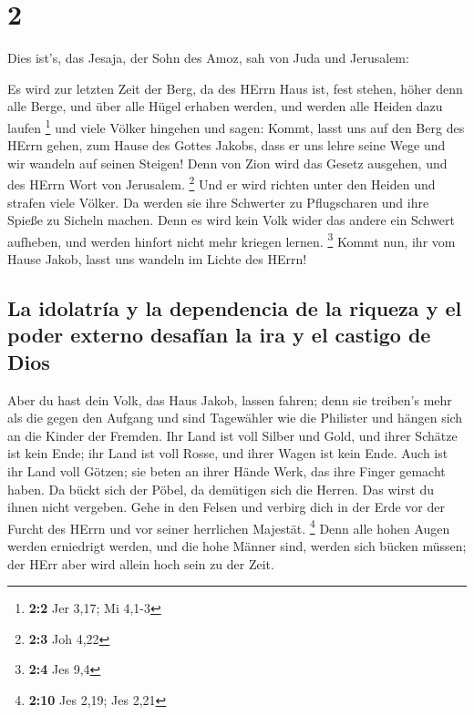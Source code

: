 \hypertarget{section-1}{%
\section{2}\label{section-1}}

 Dies ist's, das Jesaja, der Sohn des Amoz, sah von Juda
und Jerusalem:

 Es wird zur letzten Zeit der Berg, da des HErrn Haus ist,
fest stehen, höher denn alle Berge, und über alle Hügel erhaben werden,
und werden alle Heiden dazu laufen \footnote{\textbf{2:2} Jer 3,17; Mi
  4,1-3}  und viele Völker hingehen und sagen: Kommt,
lasst uns auf den Berg des HErrn gehen, zum Hause des Gottes Jakobs,
dass er uns lehre seine Wege und wir wandeln auf seinen Steigen! Denn
von Zion wird das Gesetz ausgehen, und des HErrn Wort von Jerusalem.
\footnote{\textbf{2:3} Joh 4,22}  Und er wird richten
unter den Heiden und strafen viele Völker. Da werden sie ihre Schwerter
zu Pflugscharen und ihre Spieße zu Sicheln machen. Denn es wird kein
Volk wider das andere ein Schwert aufheben, und werden hinfort nicht
mehr kriegen lernen. \footnote{\textbf{2:4} Jes 9,4} 
Kommt nun, ihr vom Hause Jakob, lasst uns wandeln im Lichte des HErrn!

\hypertarget{la-idolatruxeda-y-la-dependencia-de-la-riqueza-y-el-poder-externo-desafuxedan-la-ira-y-el-castigo-de-dios}{%
\subsection{La idolatría y la dependencia de la riqueza y el poder
externo desafían la ira y el castigo de
Dios}\label{la-idolatruxeda-y-la-dependencia-de-la-riqueza-y-el-poder-externo-desafuxedan-la-ira-y-el-castigo-de-dios}}

 Aber du hast dein Volk, das Haus Jakob, lassen fahren;
denn sie treiben's mehr als die gegen den Aufgang und sind Tagewähler
wie die Philister und hängen sich an die Kinder der Fremden.
 Ihr Land ist voll Silber und Gold, und ihrer Schätze ist
kein Ende; ihr Land ist voll Rosse, und ihrer Wagen ist kein Ende.
 Auch ist ihr Land voll Götzen; sie beten an ihrer Hände
Werk, das ihre Finger gemacht haben.  Da bückt sich der
Pöbel, da demütigen sich die Herren. Das wirst du ihnen nicht vergeben.
 Gehe in den Felsen und verbirg dich in der Erde vor der
Furcht des HErrn und vor seiner herrlichen Majestät. \footnote{\textbf{2:10}
  Jes 2,19; Jes 2,21}  Denn alle hohen Augen werden
erniedrigt werden, und die hohe Männer sind, werden sich bücken müssen;
der HErr aber wird allein hoch sein zu der Zeit.

